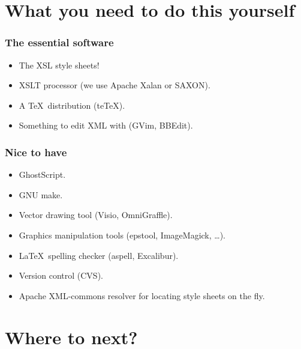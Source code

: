 \documentclass[pdftex]{beamer}
\begin{document}
\section[Software]{What you need to do this yourself}


\frame
{
	\frametitle{The essential software}
	
	\begin{itemize}
	
		\item The XSL style sheets!
	
		\item XSLT processor (we use Apache Xalan or SAXON).
		
		\item A \TeX\ distribution (te\TeX).
		
		\item Something to edit XML with (GVim, BBEdit).
		
	\end{itemize}
}


\frame
{
	\frametitle{Nice to have}
	
	\begin{itemize}
	
		\item GhostScript.
		
		\item GNU make.
		
		\item Vector drawing tool (Visio, OmniGraffle).
		
		\item Graphics manipulation tools (epstool, ImageMagick, \ldots).
		
		\item \LaTeX\ spelling checker (aspell, Excalibur).
		
		\item Version control (CVS).
		
		\item Apache XML-commons resolver for locating style sheets on
		the fly.
		
	
	\end{itemize}
}


\section[Future]{Where to next?}
\end{document}
